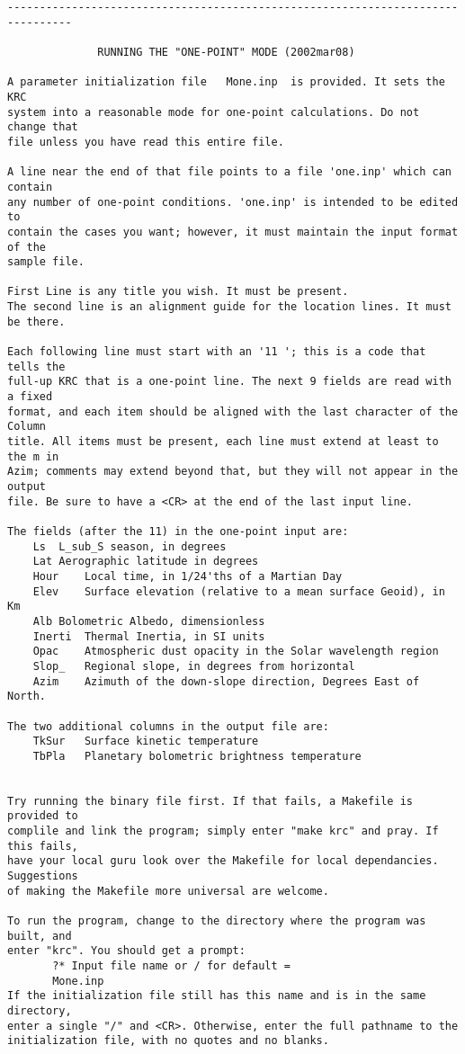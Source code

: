 \begin{verbatim}
--------------------------------------------------------------------------------

              RUNNING THE "ONE-POINT" MODE (2002mar08)

A parameter initialization file   Mone.inp  is provided. It sets the KRC 
system into a reasonable mode for one-point calculations. Do not change that 
file unless you have read this entire file.

A line near the end of that file points to a file 'one.inp' which can contain
any number of one-point conditions. 'one.inp' is intended to be edited to
contain the cases you want; however, it must maintain the input format of the
sample file.

First Line is any title you wish. It must be present.
The second line is an alignment guide for the location lines. It must be there.

Each following line must start with an '11 '; this is a code that tells the
full-up KRC that is a one-point line. The next 9 fields are read with a fixed
format, and each item should be aligned with the last character of the Column
title. All items must be present, each line must extend at least to the m in
Azim; comments may extend beyond that, but they will not appear in the output
file. Be sure to have a <CR> at the end of the last input line.

The fields (after the 11) in the one-point input are:
	Ls 	L_sub_S season, in degrees
	Lat	Aerographic latitude in degrees
	Hour	Local time, in 1/24'ths of a Martian Day
	Elev	Surface elevation (relative to a mean surface Geoid), in Km
	Alb	Bolometric Albedo, dimensionless
	Inerti	Thermal Inertia, in SI units
	Opac	Atmospheric dust opacity in the Solar wavelength region
	Slop_	Regional slope, in degrees from horizontal
	Azim	Azimuth of the down-slope direction, Degrees East of North.

The two additional columns in the output file are:
  	TkSur	Surface kinetic temperature
	TbPla	Planetary bolometric brightness temperature


Try running the binary file first. If that fails, a Makefile is provided to
complile and link the program; simply enter "make krc" and pray. If this fails,
have your local guru look over the Makefile for local dependancies. Suggestions
of making the Makefile more universal are welcome.

To run the program, change to the directory where the program was built, and
enter "krc". You should get a prompt:
       ?* Input file name or / for default =
       Mone.inp                         
If the initialization file still has this name and is in the same directory,
enter a single "/" and <CR>. Otherwise, enter the full pathname to the 
initialization file, with no quotes and no blanks.


\end{verbatim}
